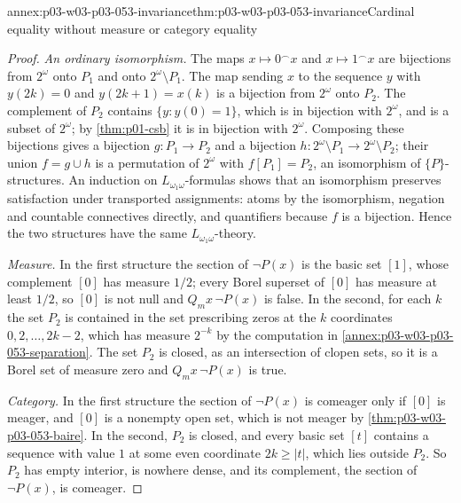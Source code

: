 \begin{annexitem}{annex:p03-w03-p03-053-invariance}{thm:p03-w03-p03-053-invariance}{Cardinal equality without measure or category equality}
\begin{proof}
\emph{An ordinary isomorphism.} The maps \(x\mapsto0^\frown x\) and
\(x\mapsto1^\frown x\) are bijections from \(2^\omega\) onto \(P_1\) and
onto \(2^\omega\setminus P_1\). The map sending \(x\) to the sequence
\(y\) with \(y(2k)=0\) and \(y(2k+1)=x(k)\) is a bijection from
\(2^\omega\) onto \(P_2\). The complement of \(P_2\) contains
\(\{y:y(0)=1\}\), which is in bijection with \(2^\omega\), and is a
subset of \(2^\omega\); by \cref{thm:p01-csb} it is in bijection with
\(2^\omega\). Composing these bijections gives a bijection
\(g:P_1\to P_2\) and a bijection
\(h:2^\omega\setminus P_1\to2^\omega\setminus P_2\); their union
\(f=g\cup h\) is a permutation of \(2^\omega\) with \(f[P_1]=P_2\), an
isomorphism of \(\{P\}\)-structures. An induction on
\(L_{\omega_1\omega}\)-formulas shows that an isomorphism preserves
satisfaction under transported assignments: atoms by the isomorphism,
negation and countable connectives directly, and quantifiers because
\(f\) is a bijection. Hence the two structures have the same
\(L_{\omega_1\omega}\)-theory.

\emph{Measure.} In the first structure the section of \(\neg P(x)\) is
the basic set \([1]\), whose complement \([0]\) has measure \(1/2\); every
Borel superset of \([0]\) has measure at least \(1/2\), so \([0]\) is not
null and \(Q_mx\,\neg P(x)\) is false. In the second, for each \(k\) the
set \(P_2\) is contained in the set prescribing zeros at the \(k\)
coordinates \(0,2,\ldots,2k-2\), which has measure \(2^{-k}\) by the
computation in \cref{annex:p03-w03-p03-053-separation}. The set \(P_2\)
is closed, as an intersection of clopen sets, so it is a Borel set of
measure zero and \(Q_mx\,\neg P(x)\) is true.

\emph{Category.} In the first structure the section of \(\neg P(x)\) is
comeager only if \([0]\) is meager, and \([0]\) is a nonempty open set,
which is not meager by \cref{thm:p03-w03-p03-053-baire}. In the second,
\(P_2\) is closed, and every basic set \([t]\) contains a sequence with
value \(1\) at some even coordinate \(2k\ge|t|\), which lies outside
\(P_2\). So \(P_2\) has empty interior, is nowhere dense, and its
complement, the section of \(\neg P(x)\), is comeager.


\end{proof}
\end{annexitem}
